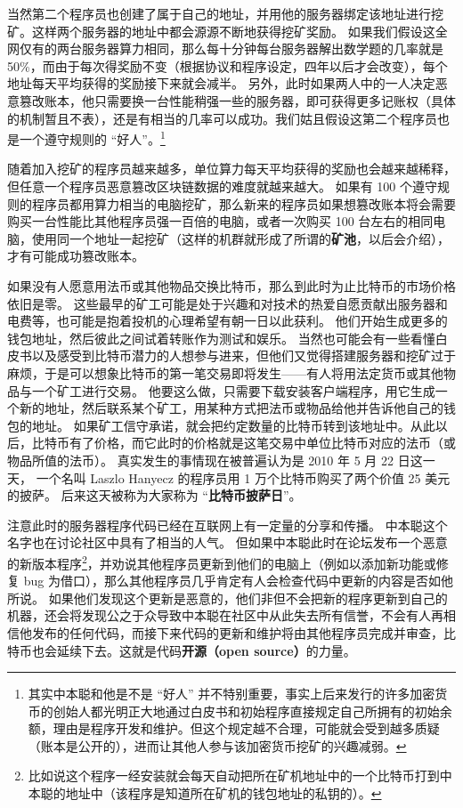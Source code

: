 当然第二个程序员也创建了属于自己的地址，并用他的服务器绑定该地址进行挖矿。这样两个服务器的地址中都会源源不断地获得挖矿奖励。 如果我们假设这全网仅有的两台服务器算力相同，那么每十分钟每台服务器解出数学题的几率就是 50\%，而由于每次得奖励不变（根据协议和程序设定，四年以后才会改变），每个地址每天平均获得的奖励接下来就会减半。 另外，此时如果两人中的一人决定恶意篡改账本，他只需要换一台性能稍强一些的服务器，即可获得更多记账权（具体的机制暂且不表），还是有相当的几率可以成功。我们姑且假设这第二个程序员也是一个遵守规则的 “好人”。\footnote{其实中本聪和他是不是 “好人” 并不特别重要，事实上后来发行的许多加密货币的创始人都光明正大地通过白皮书和初始程序直接规定自己所拥有的初始余额，理由是程序开发和维护。但这个规定越不合理，可能就会受到越多质疑（账本是公开的），进而让其他人参与该加密货币挖矿的兴趣减弱。}

随着加入挖矿的程序员越来越多，单位算力每天平均获得的奖励也会越来越稀释，但任意一个程序员恶意篡改区块链数据的难度就越来越大。 如果有 100 个遵守规则的程序员都用算力相当的电脑挖矿，那么新来的程序员如果想篡改账本将会需要购买一台性能比其他程序员强一百倍的电脑，或者一次购买 100 台左右的相同电脑，使用同一个地址一起挖矿（这样的机群就形成了所谓的\textbf{矿池}，以后会介绍），才有可能成功篡改账本。

如果没有人愿意用法币或其他物品交换比特币，那么到此时为止比特币的市场价格依旧是零。 这些最早的矿工可能是处于兴趣和对技术的热爱自愿贡献出服务器和电费等，也可能是抱着投机的心理希望有朝一日以此获利。 他们开始生成更多的钱包地址，然后彼此之间试着转账作为测试和娱乐。 当然也可能会有一些看懂白皮书以及感受到比特币潜力的人想参与进来，但他们又觉得搭建服务器和挖矿过于麻烦，于是可以想象比特币的第一笔交易即将发生——有人将用法定货币或其他物品与一个矿工进行交易。 他要这么做，只需要下载安装客户端程序，用它生成一个新的地址，然后联系某个矿工，用某种方式把法币或物品给他并告诉他自己的钱包的地址。 如果矿工信守承诺，就会把约定数量的比特币转到该地址中。从此以后，比特币有了价格，而它此时的价格就是这笔交易中单位比特币对应的法币（或物品所值的法币）。 真实发生的事情现在被普遍认为是 2010 年 5 月 22 日这一天， 一个名叫 Laszlo Hanyecz 的程序员用 1 万个比特币购买了两个价值 25 美元的披萨。 后来这天被称为大家称为 “\textbf{比特币披萨日}”。

注意此时的服务器程序代码已经在互联网上有一定量的分享和传播。 中本聪这个名字也在讨论社区中具有了相当的人气。 但如果中本聪此时在论坛发布一个恶意的新版本程序\footnote{比如说这个程序一经安装就会每天自动把所在矿机地址中的一个比特币打到中本聪的地址中（该程序是知道所在矿机的钱包地址的私钥的）。}，并劝说其他程序员更新到他们的电脑上（例如以添加新功能或修复 bug 为借口），那么其他程序员几乎肯定有人会检查代码中更新的内容是否如他所说。 如果他们发现这个更新是恶意的，他们非但不会把新的程序更新到自己的机器，还会将发现公之于众导致中本聪在社区中从此失去所有信誉，不会有人再相信他发布的任何代码，而接下来代码的更新和维护将由其他程序员完成并审查，比特币也会延续下去。这就是代码\textbf{开源（open source）}的力量。

